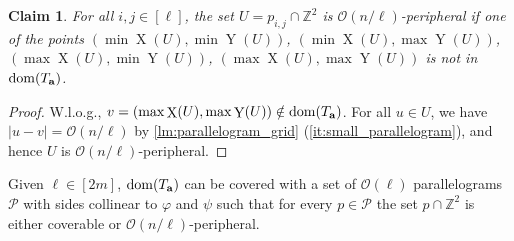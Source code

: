 \documentclass[twoside,leqno]{article}
\newtheorem{claim}{Claim}[section]
\newcommand{\Z}{\mathbb{Z}}
\renewcommand{\O}{\mathcal{O}}
\renewcommand{\phi}{\varphi}
\DeclareMathOperator*{\X}{X}
\DeclareMathOperator*{\Y}{Y}
\newcommand{\absolute}[1]{\left\lvert#1\right\rvert}
\begin{document}
\begin{claim}\label{peripheral}
For all $i,j \in [\ell]$, the set $U = p_{i,j} \cap \Z^2$ is $\O(n / \ell)$-peripheral if one of the points $(\min \X(U), \min \Y(U))$, $(\min \X(U), \max \Y(U))$, $(\max \X(U), \min \Y(U))$, $(\max \X(U), \max \Y(U))$ is not in $\operatorname*{dom}(T_\mathbf{a})$.
\end{claim}
\begin{proof}
W.l.o.g., $v = (\max \X(U), \max \Y(U)) \notin \d{\Ta}$. For all $u \in U$, we have $\absolute{u-v} = \O(n / \ell)$ by \cref{lm:parallelogram_grid} (\ref{it:small_parallelogram}), and hence $U$ is $\O(n / \ell)$-peripheral.
\end{proof}

\begin{lemma}\label{lm:parallelogram_merge}
Given $\ell \in [2m]$, $\operatorname*{dom}(T_\mathbf{a})$ can be covered with a set of $\O(\ell)$ parallelograms $\mathcal{P}$ with sides collinear to $\phi$ and $\psi$ such that for every $p \in \mathcal{P}$ the set $p \cap \Z^2$ is either coverable or $\O(n / \ell)$-peripheral. 
\end{lemma}
\end{document}
